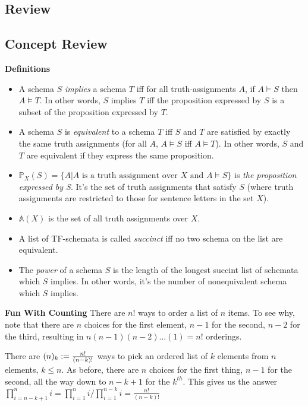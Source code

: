 \subsection{Review}
\begin{mdframed}[linewidth=1]
\section*{Concept Review}
\textbf{Definitions}
\begin{itemize}
    \item A schema $S$ \emph{implies} a schema $T$ iff for all truth-assignments $A$, if $A \models S$ then $A \models T$. In other words, $S$ implies $T$ iff the proposition expressed by $S$ is a subset of the proposition expressed by $T$. 
    
    \item A schema $S$ is \emph{equivalent} to a schema $T$ iff $S$ and $T$ are satisfied by exactly the same truth assignments (for all $A$, $A \models S$ iff $A \models T$). In other words, $S$ and $T$ are equivalent if they express the same proposition. 

    \item $\mathbb{P}_X(S) = \{A | A \text{ is a truth assignment over } X \text{ and } A \models S\}$ is \emph{the proposition expressed by S}. It's the set of truth assignments that satisfy $S$ (where truth assignments are restricted to those for sentence letters in the set $X$). 
    
    \item $\mathbb{A}(X)$ is the set of all truth assignments over $X$. 
    
    \item A list of TF-schemata is called \emph{succinct} iff no two schema on the list are equivalent. 
    
    \item The \emph{power} of a schema $S$ is the length of the longest succint list of schemata which $S$ implies. In other words, it's the number of nonequivalent schema which $S$ implies. 
\end{itemize}

\textbf{Fun With Counting}
There are $n!$ ways to order a list of $n$ items. To see why, note that there are $n$ choices for the first element, $n - 1$ for the second, $n - 2$ for the third, resulting in $n(n - 1)(n - 2)...(1) = n!$ orderings. 

There are $\mbox{$(n)_{k}$} := \frac{n!}{(n-k)!}$ ways to pick an ordered list of $k$ elements from $n$ elements, $k \leq n$. As before, there are $n$ choices for the first thing, $n-1$ for the second, all the way down to $n-k+1$ for the $k^{th}$. This gives us the answer $\prod_{i = n - k + 1}^ni = \prod_{i = 1}^ni / \prod_{i = 1}^{n - k}i = \frac{n!}{(n-k)!}$   


\end{mdframed}
